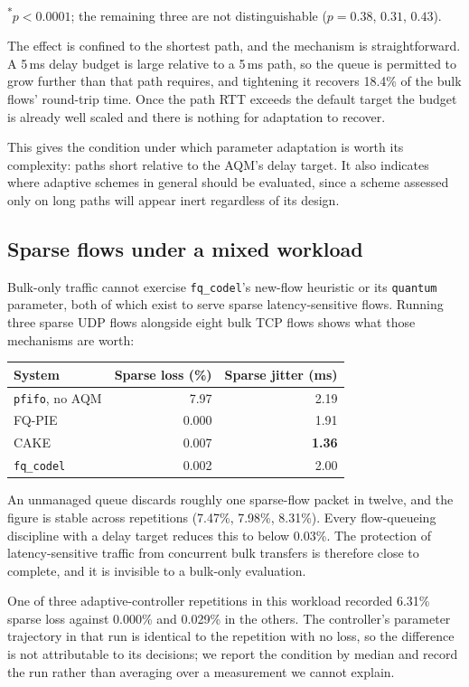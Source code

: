 \noindent\textsuperscript{*}$p < 0.0001$; the remaining three are not
distinguishable ($p = 0.38$, $0.31$, $0.43$).

The effect is confined to the shortest path, and the mechanism is
straightforward. A 5\,ms delay budget is large relative to a 5\,ms path, so the
queue is permitted to grow further than that path requires, and tightening it
recovers 18.4\% of the bulk flows' round-trip time. Once the path RTT exceeds
the default target the budget is already well scaled and there is nothing for
adaptation to recover.

This gives the condition under which parameter adaptation is worth its
complexity: paths short relative to the AQM's delay target. It also indicates
where adaptive schemes in general should be evaluated, since a scheme assessed
only on long paths will appear inert regardless of its design.

\subsection{Sparse flows under a mixed workload}

Bulk-only traffic cannot exercise \texttt{fq\_codel}'s new-flow heuristic or
its \texttt{quantum} parameter, both of which exist to serve sparse
latency-sensitive flows. Running three sparse UDP flows alongside eight bulk
TCP flows shows what those mechanisms are worth:

\begin{center}
\begin{tabular}{lrr}
\toprule
\textbf{System} & \textbf{Sparse loss (\%)} & \textbf{Sparse jitter (ms)} \\
\midrule
\texttt{pfifo}, no AQM & 7.97 & 2.19 \\
FQ-PIE                 & 0.000 & 1.91 \\
CAKE                   & 0.007 & \textbf{1.36} \\
\texttt{fq\_codel}     & 0.002 & 2.00 \\
\bottomrule
\end{tabular}
\end{center}

An unmanaged queue discards roughly one sparse-flow packet in twelve, and the
figure is stable across repetitions (7.47\%, 7.98\%, 8.31\%). Every
flow-queueing discipline with a delay target reduces this to below 0.03\%. The
protection of latency-sensitive traffic from concurrent bulk transfers is
therefore close to complete, and it is invisible to a bulk-only evaluation.

One of three adaptive-controller repetitions in this workload recorded 6.31\%
sparse loss against 0.000\% and 0.029\% in the others. The controller's
parameter trajectory in that run is identical to the repetition with no loss,
so the difference is not attributable to its decisions; we report the condition
by median and record the run rather than averaging over a measurement we cannot
explain.
